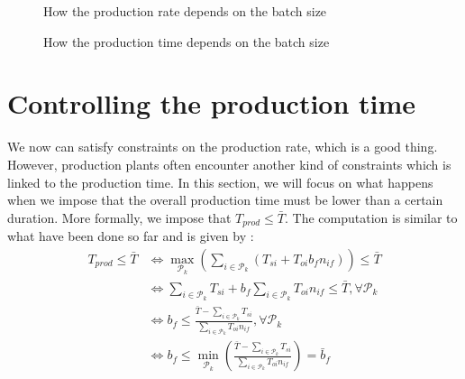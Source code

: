 \begin{figure}[p]
    \centering
    \caption{\label{setup:production_rate_depends}How the production rate depends on the batch size}
    \caption{\label{setup:production_time_depends}How the production time depends on the batch size}
\end{figure}

\section{Controlling the production time}

We now can satisfy constraints on the production rate, which is a good thing. However, production plants often encounter another kind of constraints which is linked to the production time. In this section, we will focus on what happens when we impose that the overall production time must be lower than a certain duration. More formally, we impose that $T_{prod}\le\bar T$. The computation is similar to what have been done so far and is given by :
\[
    \begin{split}
        T_{prod}\le\bar T
            &\Leftrightarrow \max_{\mathcal P_k}\left( \sum_{i\in\mathcal P_k} ( T_{si} + T_{oi}b_fn_{if} ) \right)\le\bar T\\
            &\Leftrightarrow \sum_{i\in\mathcal P_k} T_{si} + b_f\sum_{i\in\mathcal P_k}T_{oi}n_{if} \le\bar T, \forall\mathcal P_k\\
            &\Leftrightarrow b_f\le \frac{\bar T - \sum_{i\in\mathcal P_k}T_{si}}{\sum_{i\in\mathcal P_k} T_{oi}n_{if}}, \forall\mathcal P_k\\
            &\Leftrightarrow b_f\le\min_{\mathcal P_k}\left( \frac{\bar T - \sum_{i\in\mathcal P_k} T_{si}}{\sum_{i\in\mathcal P_k}T_{oi}n_{if}} \right) = \bar b_f
    \end{split}
\]

